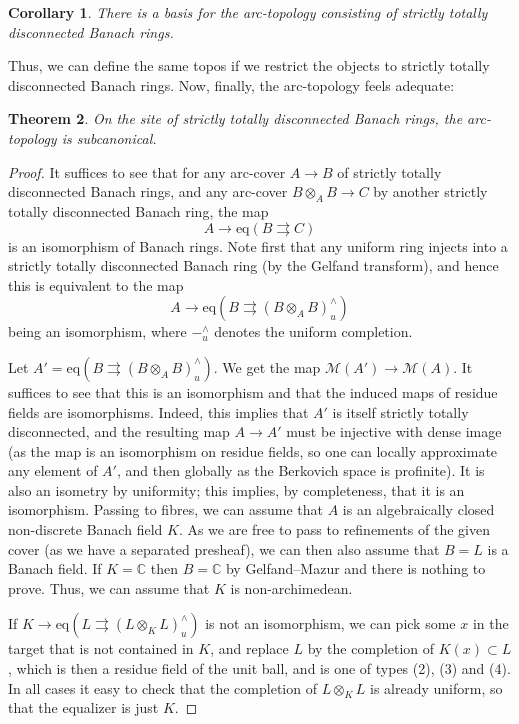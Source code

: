\documentclass[11pt]{amsart}
\numberwithin{equation}{section}
\newtheorem{theorem}{Theorem}
\numberwithin{theorem}{section}
\newtheorem{corollary}[theorem]{Corollary}
\theoremstyle{definition}
\begin{document}
\begin{corollary} There is a basis for the arc-topology consisting of strictly totally disconnected Banach rings.
\end{corollary}

Thus, we can define the same topos if we restrict the objects to strictly totally disconnected Banach rings. Now, finally, the arc-topology feels adequate:

\begin{theorem} On the site of strictly totally disconnected Banach rings, the arc-topology is subcanonical.
\end{theorem}

\begin{proof} It suffices to see that for any arc-cover $A\to B$ of strictly totally disconnected Banach rings, and any arc-cover $B\otimes_A B\to C$ by another strictly totally disconnected Banach ring, the map
\[
A\to \mathrm{eq}(B\rightrightarrows C)
\]
is an isomorphism of Banach rings. Note first that any uniform ring injects into a strictly totally disconnected Banach ring (by the Gelfand transform), and hence this is equivalent to the map
\[
A\to \mathrm{eq}(B\rightrightarrows (B\otimes_A B)_u^\wedge)
\]
being an isomorphism, where $-_u^\wedge$ denotes the uniform completion.

Let $A'=\mathrm{eq}(B\rightrightarrows (B\otimes_A B)_u^\wedge)$. We get the map $\mathcal M(A')\to \mathcal M(A)$. It suffices to see that this is an isomorphism and that the induced maps of residue fields are isomorphisms. Indeed, this implies that $A'$ is itself strictly totally disconnected, and the resulting map $A\to A'$ must be injective with dense image (as the map is an isomorphism on residue fields, so one can locally approximate any element of $A'$, and then globally as the Berkovich space is profinite). It is also an isometry by uniformity; this implies, by completeness, that it is an isomorphism. Passing to fibres, we can assume that $A$ is an algebraically closed non-discrete Banach field $K$. As we are free to pass to refinements of the given cover (as we have a separated presheaf), we can then also assume that $B=L$ is a Banach field. If $K=\mathbb C$ then $B=\mathbb C$ by Gelfand--Mazur and there is nothing to prove. Thus, we can assume that $K$ is non-archimedean.

If $K\to \mathrm{eq}(L\rightrightarrows (L\otimes_K L)_u^\wedge)$ is not an isomorphism, we can pick some $x$ in the target that is not contained in $K$, and replace $L$ by the completion of $K(x)\subset L$, which is then a residue field of the unit ball, and is one of types (2), (3) and (4). In all cases it easy to check that the completion of $L\otimes_K L$ is already uniform, so that the equalizer is just $K$.
\end{proof}
\end{document}
